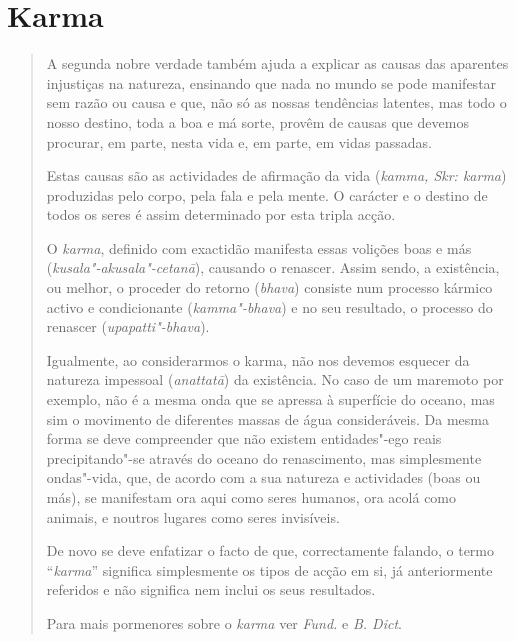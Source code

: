\section{Karma}

\begin{quote}
  A segunda nobre verdade também ajuda a explicar as causas das aparentes
  injustiças na natureza, ensinando que nada no mundo se pode manifestar sem
  razão ou causa e que, não só as nossas tendências latentes, mas todo o nosso
  destino, toda a boa e má sorte, provêm de causas que devemos procurar, em
  parte, nesta vida e, em parte, em vidas passadas.

  Estas causas são as actividades de afirmação da vida (\emph{kamma, Skr:
    karma}) produzidas pelo corpo, pela fala e pela mente. O carácter e o
  destino de todos os seres é assim determinado por esta tripla acção.

  O \emph{karma}, definido com exactidão manifesta essas volições boas e más
  (\emph{kusala"-akusala"-cetanā}), causando o renascer. Assim sendo, a
  existência, ou melhor, o proceder do retorno (\emph{bhava}) consiste num
  processo kármico activo e condicionante (\emph{kamma"-bhava}) e no seu
  resultado, o processo do renascer (\emph{upapatti"-bhava}).

  Igualmente, ao considerarmos o karma, não nos devemos esquecer da natureza
  impessoal (\emph{anattatā}) da existência. No caso de um maremoto por exemplo,
  não é a mesma onda que se apressa à superfície do oceano, mas sim o movimento
  de diferentes massas de água consideráveis. Da mesma forma se deve compreender
  que não existem entidades"-ego reais precipitando"-se através do oceano do
  renascimento, mas simplesmente ondas"-vida, que, de acordo com a sua natureza e
  actividades (boas ou más), se manifestam ora aqui como seres humanos, ora
  acolá como animais, e noutros lugares como seres invisíveis.

  De novo se deve enfatizar o facto de que, correctamente falando, o termo
  ``\emph{karma}'' significa simplesmente os tipos de acção em si, já
  anteriormente referidos e não significa nem inclui os seus resultados.

  Para mais pormenores sobre o \emph{karma} ver \emph{Fund.} e \emph{B. Dict}.
\end{quote}
